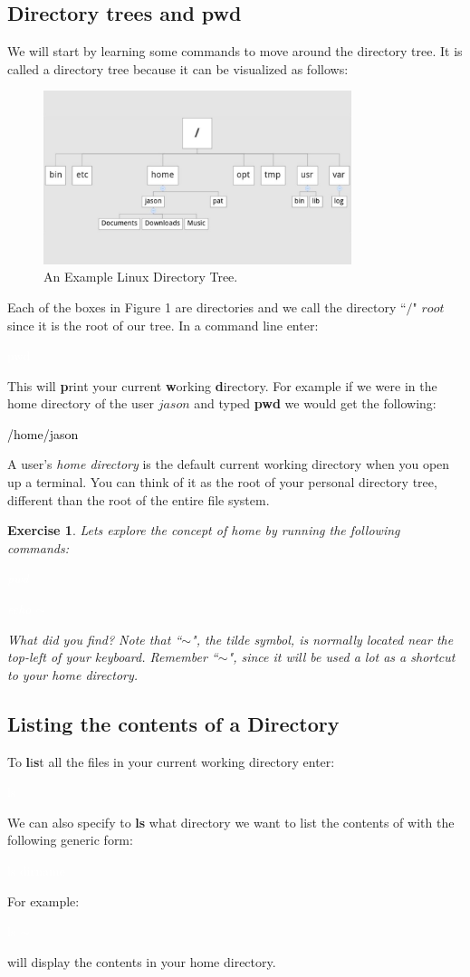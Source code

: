 \documentclass[oneside]{book}
\newcommand{\commandline}[1]{\begin{center} \colorbox{Dark}{\textcolor{white}{#1}} \end{center}}
\newcommand{\exampleout}[1]{\begin{center} \colorbox{Light}{\textcolor{black}{#1}} \end{center}}
\newtheorem{ex}{Exercise}[chapter]
\begin{document}
\subsection{Directory trees and pwd}
We will start by learning some commands to move around the directory tree. It is called a directory tree because it can be visualized as follows:

\begin{figure}[H]
	\centering
	\label{tab:directory_tree}
	\includegraphics[width=90mm]{linux-directory-tree.jpg}
	\caption{An Example Linux Directory Tree.} 
\end{figure}

Each of the boxes in Figure 1 are directories and we call the directory ``$/$" $root$ since it is the root of our tree. In a command line enter:
	\commandline{pwd}
  This will \textbf{p}rint your current \textbf{w}orking \textbf{d}irectory. For example if we were in the home directory of the user $jason$ and typed \textbf{pwd} we would get the following:
	\exampleout {/home/jason}
	
A user's \textit{home directory} is the default current working directory when you open up a terminal. You can think of it as the root of your personal directory tree, different than the root of the entire file system.


\begin{ex} 
	Lets explore the concept of home by running the following commands:
	\commandline{pwd}
	\commandline{echo $\sim$ }
	What did you find? Note that ``$\sim$", the tilde symbol, is normally located near the top-left of your keyboard. Remember ``$\sim$", since it will be used a lot as a shortcut to your home directory.
\end{ex}

\newpage
\subsection{Listing the contents of a Directory}
To \textbf{l}i\textbf{s}t all the files in your current working directory enter:
	\commandline{ls}
	We can also specify to \textbf{ls} what directory we want to list the contents of with the following generic form:
  	\commandline{ls dirname}
For example:
	\commandline{ls $\sim$}
will display the contents in your home directory.
\end{document}
